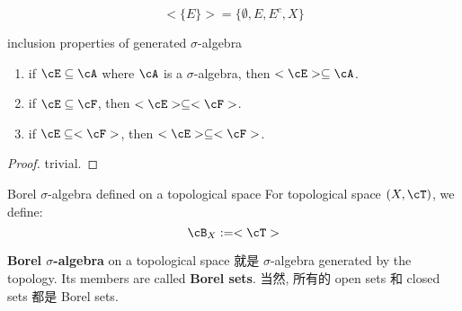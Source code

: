 \documentclass[lang=cn,11pt]{elegantbook}
\begin{document}
\begin{example}
\begin{equation}
    <\{ E\}> = \{ \emptyset, E, E^c, X       \}
\end{equation}
\end{example}


\begin{lemma}{inclusion properties of generated $\sigma$-algebra}
\label{inclusion properties of generated sigma-algebra}
\begin{enumerate}
    \item if $\cE \sub \cA$ where $\cA$ is a $\sigma$-algebra, then $<\cE> \sub \cA$.
    \item if $\cE \sub \cF$, then $<\cE> \sub <\cF>$.
    \item if $\cE \sub <\cF>$, then $<\cE> \sub <\cF>$.
\end{enumerate}
\end{lemma}
\begin{proof}
    trivial.
\end{proof}

\begin{definition}{Borel $\sigma$-algebra defined on a topological space}
For topological space $(X, \cT)$, we define:
$$
\cB_X := <\cT>
$$
\end{definition}
\noindent \textbf{Borel $\sigma$-algebra} on a topological space 就是 $\sigma$-algebra generated by the topology. Its members are called \textbf{Borel sets}. 当然, 所有的 open sets 和 closed sets 都是 Borel sets.
\end{document}
